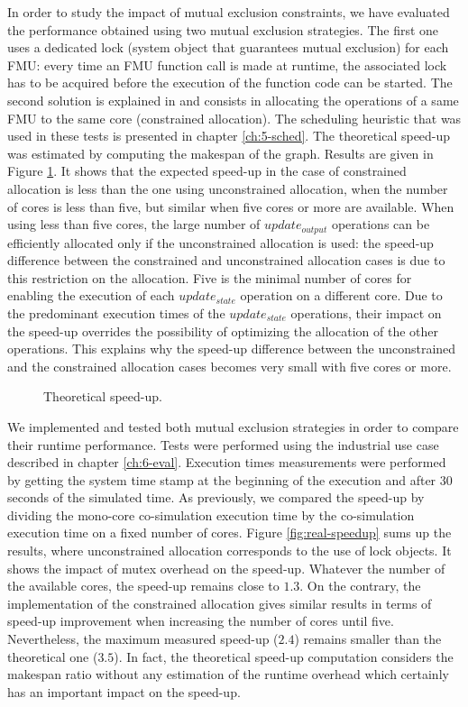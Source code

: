 In order to study the impact of mutual exclusion constraints, we have evaluated the performance obtained using two mutual exclusion strategies. The first one uses a dedicated lock (system object that guarantees mutual exclusion) for each FMU: every time an FMU function call is made at runtime, the associated lock has to be acquired before the execution of the function code can be started. The second solution is explained in \cite{benkhaled:2014} and consists in allocating the operations of a same FMU to the same core (constrained allocation). The scheduling heuristic that was used in these tests is presented in chapter \ref{ch:5-sched}. The theoretical speed-up was estimated by computing the makespan of the graph. Results are given in Figure \ref{fig:theoretical-speedup}. It shows that the expected speed-up in the case of constrained allocation is less than the one using unconstrained allocation, when the number of cores is less than five, but similar when five cores or more are available. When using less than five cores, the large number of $update_{output}$ operations can be efficiently allocated only if the unconstrained allocation is used: the speed-up difference between the constrained and unconstrained allocation cases is due to this restriction on the allocation. Five is the minimal number of cores for enabling the execution of each $update_{state}$ operation on a different core. Due to the predominant execution times of the $update_{state}$ operations, their impact on the speed-up overrides the possibility of optimizing the allocation of the other operations. This explains why the speed-up difference between the unconstrained and the constrained allocation cases becomes very small with five cores or more.

\begin{figure}[phbt]
\centering

\caption{Theoretical speed-up.}
\label{fig:theoretical-speedup}
\end{figure}

We implemented and tested both mutual exclusion strategies in order to compare their runtime performance. Tests were performed using the industrial use case described in chapter \ref{ch:6-eval}. Execution times measurements were performed by getting the system time stamp at the beginning of the execution and after $30$ seconds of the simulated time. As previously, we compared the speed-up by dividing the mono-core co-simulation execution time by the co-simulation execution time on a fixed number of cores. Figure \ref{fig:real-speedup} sums up the results, where unconstrained allocation corresponds to the use of lock objects. It shows the impact of mutex overhead on the speed-up. Whatever the number of the available cores, the speed-up remains close to $1.3$. On the contrary, the implementation of the constrained allocation gives similar results in terms of speed-up improvement when increasing the number of cores until five. Nevertheless, the maximum measured speed-up ($2.4$) remains smaller than the theoretical one ($3.5$). In fact, the theoretical speed-up computation considers the makespan ratio without any estimation of the runtime overhead which certainly has an important impact on the speed-up.


